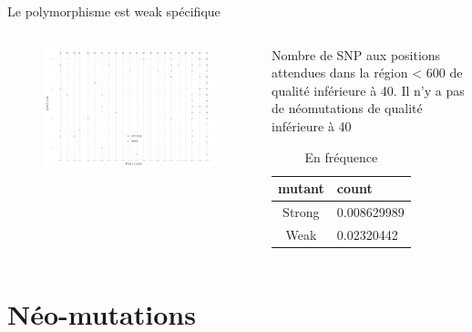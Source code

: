 \documentclass[xcolor=dvipsnames]{beamer}
\begin{document}
\begin{frame}{Le polymorphisme est weak spécifique}
  \begin{columns}
    \begin{column}{.7\textwidth}
      \begin{figure}[htbp]
        \centering
        \includegraphics[width=0.8\linewidth]{../qualite_distrib.pdf}
      \end{figure}
      
    \end{column}
    
    \begin{column}{.3\textwidth}
      \tiny
      \ttfamily
      \begin{table}[htbp]
        \centering
        
        \caption*{\tiny Nombre de SNP aux positions attendues dans la région <
          600 de qualité inférieure à
          40. Il n'y a pas de néomutations de qualité inférieure à 40}
      \end{table}
      \begin{table}[htbp]
        \ttfamily
        \centering
        \begin{tabular}{cl}
          \toprule
          mutant & count\\
          \midrule
          Strong &  0.008629989\\
          Weak & 0.02320442\\
          \bottomrule
        \end{tabular}
        \caption*{\tiny En fréquence}
      \end{table}
    \end{column}
  \end{columns}
\end{frame}

\section{Néo-mutations}
\end{document}
